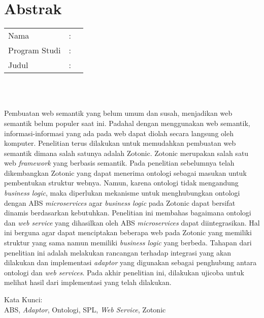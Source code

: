 %
%
%

\chapter*{Abstrak}

\vspace*{0.2cm}

\noindent \begin{tabular}{l l p{10cm}}
	Nama&: & \penulis \\
	Program Studi&: & \program \\
	Judul&: & \judul \\
\end{tabular} \\ 

\vspace*{0.5cm}

\noindent 
\\ Pembuatan web semantik yang belum umum dan susah, menjadikan web semantik belum populer saat ini. Padahal dengan menggunakan web semantik, informasi-informasi yang ada pada web dapat diolah secara langsung oleh komputer. Penelitian terus dilakukan untuk memudahkan pembuatan web semantik dimana salah satunya adalah Zotonic. Zotonic merupakan salah satu web \textit{framework} yang berbasis semantik. Pada penelitian sebelumnya telah dikembangkan Zotonic yang dapat menerima ontologi sebagai masukan untuk pembentukan struktur webnya. Namun, karena ontologi tidak mengandung \textit{business logic}, maka diperlukan mekanisme untuk menghubungkan ontologi dengan ABS \textit{microservices} agar \textit{business logic} pada Zotonic dapat bersifat dinamis berdasarkan kebutuhkan. Penelitian ini membahas bagaimana ontologi dan \textit{web service} yang dihasilkan oleh ABS \textit{microservices} dapat diintegrasikan. Hal ini berguna agar dapat menciptakan beberapa web pada Zotonic yang memiliki struktur yang sama namun memiliki \textit{business logic} yang berbeda. Tahapan dari penelitian ini adalah melakukan rancangan terhadap integrasi yang akan dilakukan dan implementasi \textit{adaptor} yang digunakan sebagai penghubung antara ontologi dan \textit{web services}. Pada akhir penelitian ini, dilakukan ujicoba untuk melihat hasil dari implementasi yang telah dilakukan.

\vspace*{0.2cm}

\noindent Kata Kunci: \\ 
\noindent ABS, \textit{Adaptor}, Ontologi, SPL, \textit{Web Service}, Zotonic\\ 

\newpage